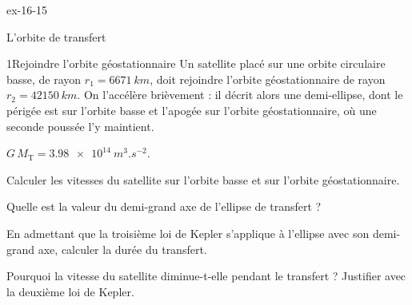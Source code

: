 \begin{blocLivre}{ex-16-15}
\begin{exercice}[3]{L'orbite de transfert}
\begin{docu}{1}{Rejoindre l'orbite géostationnaire}
Un satellite placé sur une orbite circulaire basse, de rayon $r_1=\qty{6671}{km}$, doit rejoindre l'orbite géostationnaire
de rayon $r_2=\qty{42150}{km}$. On l'accélère brièvement : il décrit alors une demi-ellipse, dont le périgée est sur l'orbite
basse et l'apogée sur l'orbite géostationnaire, où une seconde poussée l'y maintient.
\end{docu}
\begin{donnees}
$G\,M_\mathrm{T}=\qty{3,98e14}{m^3.s^{-2}}$.
\end{donnees}
\begin{questions}
\item Calculer les vitesses du satellite sur l'orbite basse et sur l'orbite géostationnaire.
\item Quelle est la valeur du demi-grand axe de l'ellipse de transfert ?
\item \initiative En admettant que la troisième loi de Kepler s'applique à l'ellipse avec son demi-grand axe, calculer la
durée du transfert.
\item Pourquoi la vitesse du satellite diminue-t-elle pendant le transfert ? Justifier avec la deuxième loi de Kepler.
\end{questions}
\end{exercice}
\end{blocLivre}
